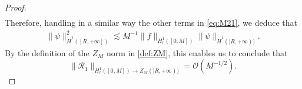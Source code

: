 \documentclass[10pt,a4paper]{amsart}
\newcommand{\cO}{\mathcal{O}}
\begin{document}
\begin{proof}
\begin{align}
\end{align}
Therefore, handling in a similar way the other terms in \cref{eq:M21}, we deduce that 
\begin{align}
    \| \psi \|_{\dot{H}^1([R,+\infty])}^2 \lesssim M^{-1} \| f\|_{H^1_r([0,M])} \|\psi\|_{\dot{H}^1([R,+\infty))}.
\end{align}
By the definition of the $Z_M$ norm in \cref{def:ZM}, this enables us to conclude that
\begin{equation}
\|\mathcal R_1\|_{H^1_r([0,M]) \rightarrow Z_M([R,+\infty))} = \cO(M^{-1/2}).
\end{equation}
\end{proof}
\end{document}
